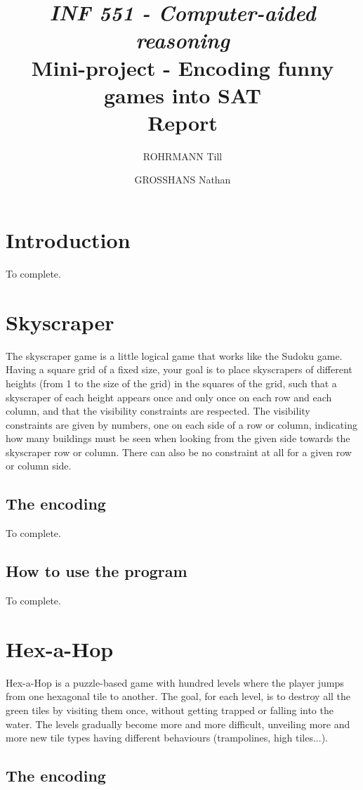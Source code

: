 \documentclass[a4paper, 12pt, titlepage]{article}
\title
{{\em INF 551 - Computer-aided reasoning}\\
Mini-project - Encoding funny games into SAT\\
{\bf Report}}
\author{ROHRMANN Till \and GROSSHANS Nathan}
\date{}
\begin{document}
\maketitle


\section{Introduction}
To complete.


\section{Skyscraper}
The skyscraper game is a little logical game that works like the Sudoku game.
Having a square grid of a fixed size, your goal is to place skyscrapers of
different heights (from 1 to the size of the grid) in the squares of the grid,
such that a skyscraper of each height appears once and only once on each row and
each column, and that the visibility constraints are respected. The visibility
constraints are given by numbers, one on each side of a row or column,
indicating how many buildings must be seen when looking from the given side
towards the skyscraper row or column. There can also be no constraint at all for
a given row or column side.

\subsection{The encoding}
To complete.

\subsection{How to use the program}
To complete.



\section{Hex-a-Hop}
Hex-a-Hop is a puzzle-based game with hundred levels where the player jumps from
one hexagonal tile to another. The goal, for each level, is to destroy all the
green tiles by visiting them once, without getting trapped or falling into the
water. The levels gradually become more and more difficult, unveiling more and
more new tile types having different behaviours (trampolines, high tiles...).

\subsection{The encoding}
\end{document}
